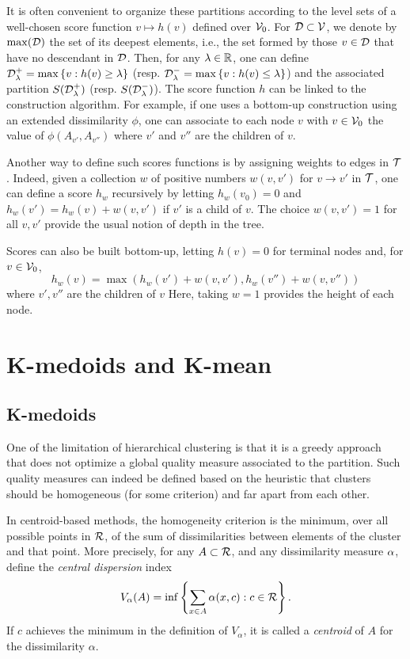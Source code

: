 It is often convenient to organize these partitions according to the level sets of  a well-chosen score function $v \mapsto h(v)$ defined over ${\mathcal V}_0$. For ${\mathcal D} \subset {\mathcal V}$, we denote by $\max({\mathcal D})$ the set of its deepest elements, i.e., the set formed by those $v\in{\mathcal D}$ that have no descendant in ${\mathcal D}$. 
Then, for any $\lambda \in{\mathbb{R}}$, one can define ${\mathcal D}^+_\lambda = \max\left\{ v: h(v) \geq \lambda \right\}$ (resp. ${\mathcal D}^-_\lambda = \max \left\{ v: h(v) \leq \lambda \right\}$) and the associated partition $S({\mathcal D}^+_\lambda)$ (resp. $S({\mathcal D}^-_\lambda)$). 
The score function $h$ can be  linked to the construction algorithm. For example, if one uses a bottom-up construction using an extended dissimilarity $\phi$, one can associate to each node $v$ with $v\in {\mathcal V}_0$ the value of $\phi(A_{v'}, A_{v''})$ where $v'$ and $v''$ are the children of $v$. 

Another way to define such scores functions is by assigning weights to edges in ${\mathcal T}$. Indeed, given a collection $w$ of positive numbers $w(v,v')$ for $v\to v'$ in ${\mathcal T}$, one can define a score $h_w$  recursively by letting $h_w(v_0) = 0$  and $h_w(v') = h_w(v) + w(v,v')$ if $v'$ is a child of $v$. The choice $w(v,v') = 1$ for all $v,v'$ provide the usual notion of depth in the tree. 

Scores can also be built bottom-up,  letting $h(v) = 0$ for terminal nodes and,  for $v\in {\mathcal V}_0$,
\[
h_w(v) = \max(h_w(v') + w(v,v'), h_w(v'')+ w(v,v''))
\]
where $v', v''$ are the children of $v$
Here, taking $w=1$ provides the height of each node.





\section{K-medoids and K-mean}
\subsection{K-medoids}
One of the limitation of  hierarchical clustering  is that it is a greedy approach that does not optimize a global quality measure associated to the partition. Such quality measures can indeed be defined based on the  heuristic that clusters should be homogeneous (for some criterion) and far apart from each other. 

In centroid-based methods, the homogeneity criterion is the minimum, over all possible points in ${\mathcal R}$, of the sum of dissimilarities between elements of the cluster and that  point. More precisely, for any $A\subset {\mathcal R}$, and any dissimilarity measure $\alpha$,  define the {\em central dispersion} index
\begin{equation}
\label{eq:v.alpha}
V_\alpha(A) = \inf\left\{\sum_{x\in A} \alpha(x, c): c\in {\mathcal R}\right\}.
\end{equation}
If $c$ achieves the minimum in the definition of $V_\alpha$, it is called a {\em centroid} of $A$ for the dissimilarity $\alpha$.


